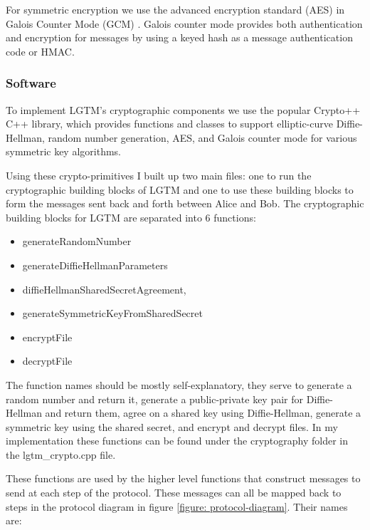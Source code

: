 \documentclass[12pt]{report}
\begin{document}
For symmetric encryption we use the advanced encryption standard (AES) \cite{AesNist2001} in Galois Counter Mode (GCM) \cite{GcmModeMcGrewNist2005}. Galois counter mode provides both authentication and encryption for messages by using a keyed hash as a message authentication code or HMAC. \par

\subsubsection{Software}
To implement LGTM's cryptographic components we use the popular Crypto++ C++ library, which provides functions and classes to support elliptic-curve Diffie-Hellman, random number generation, AES, and Galois counter mode for various symmetric key algorithms. \par

Using these crypto-primitives I built up two main files: one to run the cryptographic building blocks of LGTM and one to use these building blocks to form the messages sent back and forth between Alice and Bob. The cryptographic building blocks for LGTM are separated into 6 functions: 

\begin{itemize}
    \item generateRandomNumber
    \item generateDiffieHellmanParameters
    \item diffieHellmanSharedSecretAgreement, 
    \item generateSymmetricKeyFromSharedSecret
    \item encryptFile
    \item decryptFile
\end{itemize}

The function names should be mostly self-explanatory, they serve to generate a random number and return it, generate a public-private key pair for Diffie-Hellman and return them, agree on a shared key using Diffie-Hellman, generate a symmetric key using the shared secret, and encrypt and decrypt files. In my implementation these functions can be found under the cryptography folder in the lgtm\_crypto.cpp file. \par

These functions are used by the higher level functions that construct messages to send at each step of the protocol. These messages can all be mapped back to steps in the protocol diagram in figure \ref{figure: protocol-diagram}. Their names are: 
\end{document}
